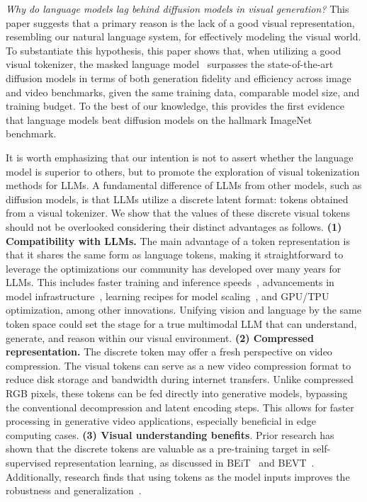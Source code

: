 \emph{Why do language models lag behind diffusion models in visual generation?} This paper suggests that a primary reason is the lack of a good visual representation, resembling our natural language system, for effectively modeling the visual world.
To substantiate this hypothesis, this paper shows that, when utilizing a good visual tokenizer, the masked language model~\citep{devlin2019bert,chang2022maskgit,yu2022magvit} surpasses the state-of-the-art diffusion models  in terms of both generation fidelity and efficiency across image and video benchmarks, given the same training data, comparable model size, and training budget. To the best of our knowledge, this provides the first evidence that language models beat diffusion models on the hallmark ImageNet benchmark. 

It is worth emphasizing that our intention is not to assert whether the language model is superior to others, but to promote the exploration of visual tokenization methods for LLMs.
A fundamental difference of LLMs from other models, such as diffusion models, is that LLMs utilize a discrete latent format: tokens obtained from a visual tokenizer.
We show that the values of these discrete visual tokens should not be overlooked considering their distinct advantages as follows. \textbf{(1) Compatibility with LLMs.} The main advantage of a token representation is that it shares the same form as language tokens, making it straightforward to leverage the optimizations our community has developed over many years for LLMs. This includes faster training and inference speeds~\citep{shazeer2019fast,lester2021power}, advancements in model infrastructure~\citep{dao2022flashattention,du2022glam}, learning recipes for model scaling~\citep{brown2020language,chowdhery2022palm}, and GPU/TPU optimization, among other innovations. Unifying vision and language by the same token space could set the stage for a true multimodal LLM that can understand, generate, and reason within our visual environment.
\textbf{(2) Compressed representation.} The discrete token may offer a fresh perspective on video compression. The 
visual tokens can serve as a new video compression format to reduce disk storage and bandwidth during internet transfers. Unlike compressed RGB pixels, these tokens can be fed directly into generative models, bypassing the conventional decompression and latent encoding steps. This allows for faster processing in generative video applications, especially beneficial in edge computing cases. \textbf{(3) Visual understanding benefits}. 
Prior research has shown that the discrete tokens are valuable as a pre-training target in self-supervised representation learning, as discussed in BEiT~\citep{bao2021beit} and BEVT~\citep{wang2022bevt}. 
Additionally, research finds that using tokens as the model inputs improves the robustness and generalization~\citep{mao2021discrete}.

